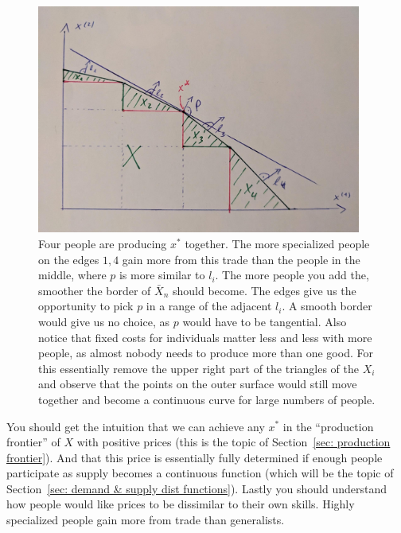 \begin{figure}
	\includegraphics[width=0.95\textwidth]{images/4_people_trade.jpeg}
	\caption{
		Four people are producing \(x^*\) together. The more specialized people
		on the edges \(1,4\) gain more from this trade than the people in the
		middle, where \(p\) is more similar to \(l_i\). The more people you add
		the, smoother the border of \(\bar{X}_n\) should become. The edges
		give us the opportunity to pick \(p\) in a range of the adjacent \(l_i\).
		A smooth border would give us no choice, as \(p\) would have to be
		tangential. Also notice that fixed costs for individuals matter less and
		less with more people, as almost nobody needs to produce more than one
		good. For this essentially remove the upper right part of the triangles
		of the \(X_i\) and observe that the points on the outer surface would
		still move together and become a continuous curve for large numbers of
		people.
	}	
\end{figure}

You should get the intuition that we can achieve any \(x^*\) in the ``production
frontier'' of \(X\) with positive prices (this is the topic of Section~\ref{sec:
production frontier}). And that this price is essentially fully determined if
enough people participate as supply becomes a continuous function (which will be
the topic of Section~\ref{sec: demand & supply dist functions}). Lastly you
should understand how people would like prices to be dissimilar to their own
skills. Highly specialized people gain more from trade than generalists.

\FloatBarrier
